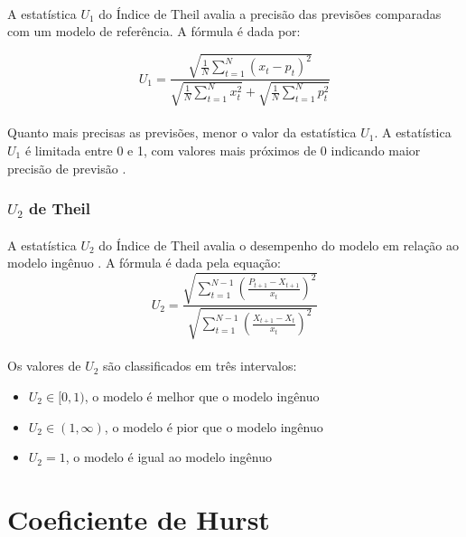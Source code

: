 \paragraph{} A estatística \( U_1 \) do Índice de Theil avalia a precisão das previsões comparadas com um modelo de referência. A fórmula é dada por:

\begin{equation}
	U_1 = \frac{\sqrt{\frac{1}{N} \sum_{t=1}^{N} (x_t - p_t)^2}}{\sqrt{\frac{1}{N} \sum_{t=1}^{N} x_t^2} + \sqrt{\frac{1}{N} \sum_{t=1}^{N} p_t^2}}
	\label{eq:u1-theil}
\end{equation}
\paragraph{} Quanto mais precisas as previsões, menor o valor da estatística \( U_1 \). A estatística \( U_1 \) é limitada entre 0 e 1, com valores mais próximos de 0 indicando maior precisão de previsão \cite{theil_forecast}.

\subsubsection{\(U_2\) de Theil}
\paragraph{} A estatística \( U_2 \) do Índice de Theil avalia o desempenho do modelo em relação ao modelo ingênuo \cite{theil_forecast}. A fórmula é dada pela equação:
\begin{equation}
	U_2 = \frac{\sqrt{\sum_{t=1}^{N-1} (\frac{P_{t+1} - X_{t+1}}{x_t})^2}}{\sqrt{\sum_{t=1}^{N-1} (\frac{X_{t+1} - X_{t}}{x_t})^2}}
	\label{eq:u2-theil}
\end{equation}
\paragraph{} Os valores de \(U_2\) são classificados em três intervalos:
\begin{itemize}
	\item \(U_2 \in [0, 1)\), o modelo é melhor que o modelo ingênuo
	\item \(U_2 \in (1, \infty)\), o modelo é pior que o modelo ingênuo
	\item \(U_2 = 1\), o modelo é igual ao modelo ingênuo
\end{itemize}

\section{Coeficiente de Hurst}

